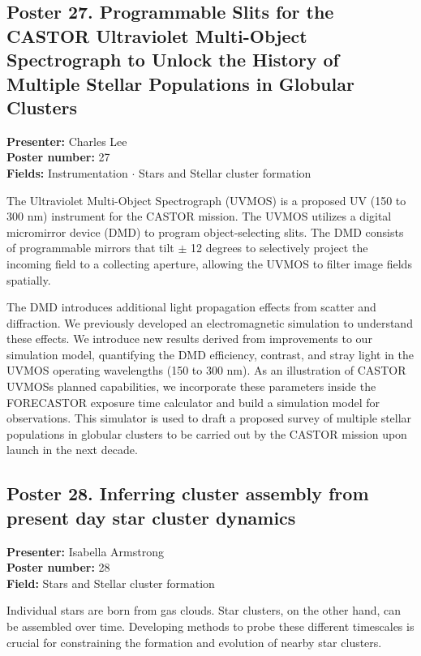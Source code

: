 \hypertarget{poster-abstract-talk-263}{}\label{poster-abstract-page-talk-263}
\subsection*{Poster 27. Programmable Slits for the CASTOR Ultraviolet Multi-Object Spectrograph to Unlock the History of Multiple Stellar Populations in Globular Clusters}
\textbf{Presenter:} Charles Lee\\
\textbf{Poster number:} 27\\
\textbf{Fields:} Instrumentation $\cdot$ Stars and Stellar cluster formation

The Ultraviolet Multi-Object Spectrograph (UVMOS) is a proposed UV (150 to 300 nm) instrument for the CASTOR mission. The UVMOS utilizes a digital micromirror device (DMD) to program object-selecting slits. The DMD consists of programmable mirrors that tilt $\pm$ 12 degrees to selectively project the incoming field to a collecting aperture, allowing the UVMOS to filter image fields spatially.

The DMD introduces additional light propagation effects from scatter and diffraction. We previously developed an electromagnetic simulation to understand these effects. We introduce new results derived from improvements to our simulation model, quantifying the DMD efficiency, contrast, and stray light in the UVMOS operating wavelengths (150 to 300 nm). As an illustration of CASTOR UVMOSs planned capabilities, we incorporate these parameters inside the FORECASTOR exposure time calculator and build a simulation model for observations. This simulator is used to draft a proposed survey of multiple stellar populations in globular clusters to be carried out by the CASTOR mission upon launch in the next decade.

\hypertarget{poster-abstract-talk-50}{}\label{poster-abstract-page-talk-50}
\subsection*{Poster 28. Inferring cluster assembly from present day star cluster dynamics}
\textbf{Presenter:} Isabella Armstrong\\
\textbf{Poster number:} 28\\
\textbf{Field:} Stars and Stellar cluster formation

Individual stars are born from gas clouds. Star clusters, on the other hand, can be assembled over time. Developing methods to probe these different timescales is crucial for constraining the formation and evolution of nearby star clusters.

